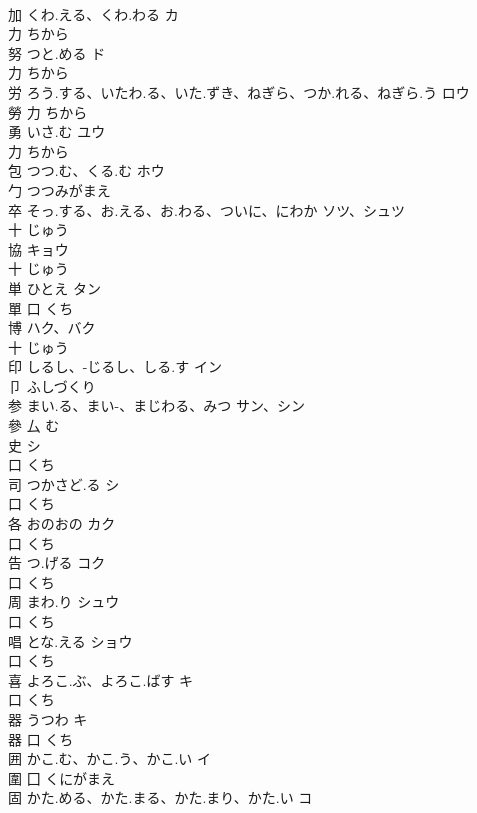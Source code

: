 \documentclass[8pt]{extreport}
\begin{document}
\begin{CJK}{UTF8}{min}
\\	加	くわ.える、くわ.わる	カ	
\\	力		ちから		
\\	努	つと.める	ド	
\\	力		ちから		
\\	労	ろう.する、いたわ.る、いた.ずき、ねぎら、つか.れる、ねぎら.う	ロウ	
\\	勞	力		ちから		
\\	勇	いさ.む	ユウ	
\\	力		ちから		
\\	包	つつ.む、くる.む	ホウ	
\\	勹		つつみがまえ		
\\	卒	そっ.する、お.える、お.わる、ついに、にわか	ソツ、シュツ	
\\	十		じゅう		
\\	協		キョウ	
\\	十		じゅう		
\\	単	ひとえ	タン	
\\	單	口		くち		
\\	博		ハク、バク	
\\	十		じゅう		
\\	印	しるし、-じるし、しる.す	イン	
\\	卩		ふしづくり		
\\	参	まい.る、まい-、まじわる、みつ	サン、シン	
\\	參	厶		む		
\\	史		シ	
\\	口		くち		
\\	司	つかさど.る	シ	
\\	口		くち		
\\	各	おのおの	カク	
\\	口		くち		
\\	告	つ.げる	コク	
\\	口		くち		
\\	周	まわ.り	シュウ	
\\	口		くち		
\\	唱	とな.える	ショウ	
\\	口		くち		
\\	喜	よろこ.ぶ、よろこ.ばす	キ	
\\	口		くち		
\\	器	うつわ	キ	
\\	器	口		くち		
\\	囲	かこ.む、かこ.う、かこ.い	イ	
\\	圍	囗		くにがまえ		
\\	固	かた.める、かた.まる、かた.まり、かた.い	コ	

\end{CJK}
\end{document}
